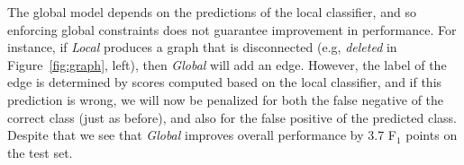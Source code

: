 The global model depends on the predictions of the local classifier, and so enforcing global constraints does not guarantee improvement in performance. For instance, if \emph{Local} produces a graph that is disconnected (e.g, \emph{deleted} in Figure~\ref{fig:graph}, left), then \emph{Global} will add an edge. However, the label of the edge is determined by scores computed based on the local classifier, and if this prediction is wrong, we will now be penalized for both the false negative of the correct class (just as before), and also for the false positive of the predicted class.  Despite that we see that \emph{Global} improves overall performance by 3.7 F$_{1}$ points on the test set.
